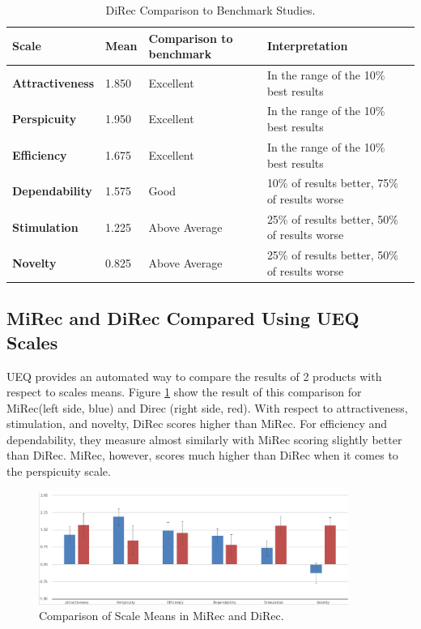 \begin{table}[!htbp]
\tiny
\centering
\begin{tabular}{|l|l|l|l|}
\hline
\textbf{Scale}          & \textbf{Mean} & \textbf{Comparison to benchmark} & \textbf{Interpretation}                       \\ \hline
\textbf{Attractiveness} & 1.850         & Excellent                         & In the range of the 10\% best results         \\ \hline
\textbf{Perspicuity}    & 1.950         & Excellent                         & In the range of the 10\% best results         \\ \hline
\textbf{Efficiency}     & 1.675         & Excellent                         & In the range of the 10\% best results         \\ \hline
\textbf{Dependability}  & 1.575         & Good                              & 10\% of results better, 75\% of results worse \\ \hline
\textbf{Stimulation}    & 1.225         & Above Average                     & 25\% of results better, 50\% of results worse \\ \hline
\textbf{Novelty}        & 0.825         & Above Average                     & 25\% of results better, 50\% of results worse \\ \hline
\end{tabular}
\caption{DiRec Comparison to Benchmark Studies.}
\label{table:table56}
\end{table}

\subsection{MiRec and DiRec Compared Using UEQ Scales}
UEQ provides an automated way to compare the results of 2 products with respect
to scales means. Figure \ref{fig:figure53} show the result of this comparison
for MiRec(left side, blue) and Direc (right side, red). With respect to
attractiveness, stimulation, and novelty, DiRec scores higher than MiRec. For
efficiency and dependability, they measure almost similarly with MiRec scoring
slightly better than DiRec. MiRec, however, scores much higher than DiRec when
it comes to the perspicuity scale.
\begin{figure}[!htbp]
\centering
\includegraphics[width=0.9\textwidth]{figures/compare}
\caption{Comparison of Scale Means in MiRec and DiRec.}
\label{fig:figure53}
\end{figure}

